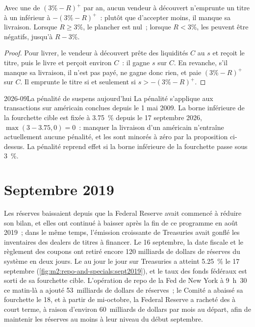 \begin{proposition}\label{prop:m2:repo-and-specials:floor}
Avec une  de $(3\% - R)^+$ par an, aucun vendeur à découvert n'emprunte un titre à un
 inférieur à $-(3\% - R)^+$~: plutôt que d'accepter moins, il manque sa livraison. Lorsque
$R \ge 3\%$, le plancher est nul~; lorsque $R < 3\%$, les  peuvent être négatifs,
jusqu'à $R - 3\%$.
\end{proposition}
\begin{proof}
Pour livrer, le vendeur à découvert prête des liquidités $C$ au  $s$ et reçoit le
titre, puis le livre et perçoit environ $C$~: il gagne $s$ sur $C$. En revanche, s'il manque sa livraison,
il n'est pas payé, ne gagne donc rien, et paie $(3\% - R)^+$ sur $C$. Il
emprunte le titre si et seulement si $s > -(3\% - R)^+$.
\end{proof}

\begin{dated}{2026-09}{La pénalité de suspens aujourd'hui}\label{dat:m2:repo-and-specials:fails}
La pénalité s'applique aux transactions sur  américain conclues depuis le 1 mai 2009.
La borne inférieure de la fourchette cible est fixée à 3.75~\% depuis le 17 septembre 2026,
$\max(3 - 3.75, 0) = 0$~: manquer la livraison d'un  américain n'entraîne actuellement
aucune pénalité, et les  sont minorés à zéro par la proposition ci-dessus.
La pénalité reprend effet si la borne inférieure de la fourchette passe sous 3~\%.
\end{dated}

\section{Septembre 2019}

Les réserves baissaient depuis que la Federal Reserve avait commencé à réduire son
bilan, et elles ont continué à baisser après la fin de ce programme en août 2019~;
dans le même temps, l'émission croissante de Treasuries avait gonflé les inventaires des dealers
de titres à financer. Le 16 septembre, la date fiscale et le règlement des coupons ont retiré
encore 120 milliards de dollars de réserves du système en deux jours. Le  au jour le jour sur Treasuries a atteint 5.25~\% le 17 septembre
(\cref{fig:m2:repo-and-specials:sept2019}), et le taux des fonds fédéraux est sorti
de sa fourchette cible. L'opération de repo de la Fed de New York à 9~h~30 ce matin-là
a ajouté 53~milliards de dollars de réserves~; le Comité a abaissé sa fourchette le 18, et
à partir de mi-octobre, la Federal Reserve a racheté des  à court terme, à raison d'environ 60~milliards de dollars
par mois au départ, afin de maintenir les réserves au moins à leur niveau du début septembre.

